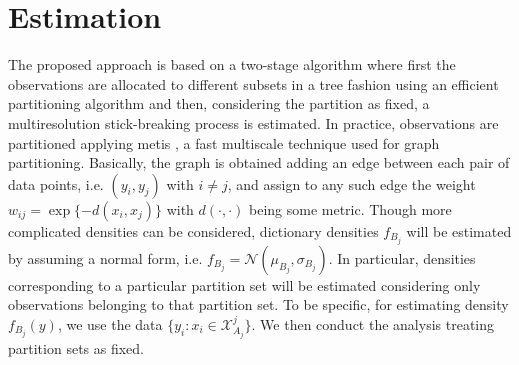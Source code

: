 \documentclass{article}
\providecommand{\mc}[1]{\mathcal{#1}}
\begin{document}
\section{Estimation}

The proposed approach is based on a two-stage algorithm where first the observations are allocated to different subsets in a tree fashion using an efficient partitioning algorithm and then, considering the partition as fixed, a multiresolution stick-breaking process is estimated. In practice, observations are partitioned applying metis \cite{metis}, a fast multiscale technique used for graph partitioning. Basically, the graph is obtained adding an edge between each pair of data points, i.e. $(y_i,y_j)$ with $i\not=j$, and assign to any such edge the weight $w_{ij}=\exp\{-d(x_i,x_j)\}$ with $d(\cdot,\cdot)$ being some metric. Though more complicated densities can be considered, dictionary densities $f_{B_j}$ will be estimated by assuming a normal form, i.e. $f_{B_j}=\mc{N}(\mu_{B_j},\sigma_{B_j})$. In particular, densities corresponding to a particular partition set will be estimated considering only observations belonging to that partition set. To be specific, for estimating density $f_{B_j}(y)$, we use the data $\{ y_i: x_i \in \mathcal{X}^j_{A_j} \}$. We then conduct the analysis treating partition sets as fixed. 
\end{document}
